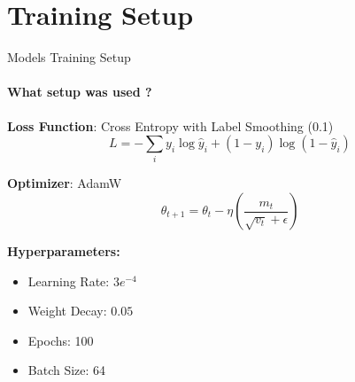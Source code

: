 \section{Training Setup}
\begin{frame}{Models Training Setup}
  \framesubtitle{What setup was used ? }
  \textbf{Loss Function}: Cross Entropy with Label Smoothing (0.1)
  \begin{equation}
    L = - \sum_{i} y_i \log \hat{y}_i + (1 - y_i) \log (1 - \hat{y}_i)
  \end{equation}

  \textbf{Optimizer}: AdamW
  \begin{equation}
    \theta_{t+1} = \theta_t - \eta \left( \frac{m_t}{\sqrt{v_t} + \epsilon} \right)
  \end{equation}

  \textbf{Hyperparameters:}
  \begin{itemize}
    \item Learning Rate: $3e^{-4}$
    \item Weight Decay: $0.05$
    \item Epochs: 100
    \item Batch Size: 64
  \end{itemize}
\end{frame}